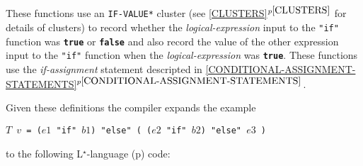 \documentclass[12pt]{article}
\newcommand{\LSTAR}{L$^\star$}
\newcommand{\TT}[1]{{\tt \bfseries #1}}
\newcommand{\itemref}[1]{\ref{#1}$^{p\pageref{#1}}$}
\newcommand{\pagref}[1]{p\pageref{#1}}
\begin{document}
These functions use an {\tt *IF-VALUE*} cluster (see
\itemref{CLUSTERS} for details of clusters) to record
whether the {\em logical-expression} input to the {\tt "if"}
function was \TT{true} or \TT{false} and also record
the value of the other expression input to the {\tt "if"}
function when the {\em logical-expression} was \TT{true}.
These functions use the {\em if-assignment} statement
descripted in \itemref{CONDITIONAL-ASSIGNMENT-STATEMENTS}.

Given these definitions the compiler expands the example
\begin{center}\label{IF-ELSE-EXAMPLE}
\tt $T$ $v$ = ($e1$ "if" $b1$) "else" ( ($e2$ "if" $b2$) "else" $e3$ )
\end{center}

to the following \LSTAR-language (\pagref{LSTAR-LANGUAGE}) code:
\end{document}
